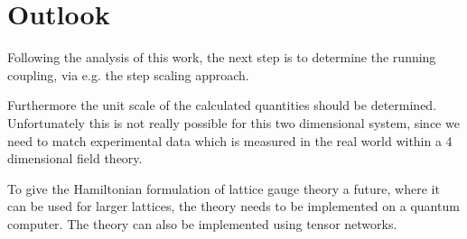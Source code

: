 \section{Outlook}
Following the analysis of this work, the next step is to determine the running coupling, via e.g. the step scaling approach.\cite{crippa2024}

Furthermore the unit scale of the calculated quantities should be determined. Unfortunately this is not really possible for this two dimensional system, since we need to match experimental data which is measured in the real world within a 4 dimensional field theory.

To give the Hamiltonian formulation of lattice gauge theory a future, where it can be used for larger lattices, the theory needs to be implemented on a quantum computer.\cite{crippa2024} The theory can also be implemented using tensor networks.\cite{wu2025accurategaugeinvarianttensornetwork, Singh_2011}
